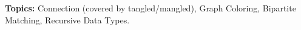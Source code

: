 \documentclass[handout]{mcs}
\begin{document}
\renewcommand{\reading}{Notes Ch.~\bref{trees-sec}--~\bref{bipartitesec};
  Ch.~\bref{digraphs_sec} }


\begin{staffnotes}
\textbf{Topics:}
Connection (covered by tangled/mangled), Graph Coloring, Bipartite Matching,
Recursive Data Types.

\end{staffnotes}










\end{document}
